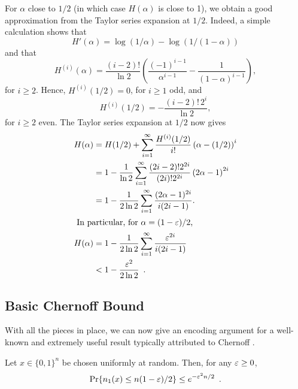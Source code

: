 \documentclass[prodmode,acmcsur]{acmsmall}
\begin{document}
For $\alpha$ close to $1/2$ (in which case $H(\alpha)$ is close to 1),
we obtain a good approximation from the Taylor series expansion at
$1/2$.  Indeed, a simple calculation shows that
\[
  H'(\alpha) = \log (1/\alpha) - \log (1/(1-\alpha))
\]
and that
\[
  H^{(i)}(\alpha) = \frac{(i-2)!}{\ln 2} \left( \frac{(-1)^{i-1}}{\alpha^{i-1}} - \frac{1}{(1-\alpha)^{i-1}}\right) ,
\]
for $i \geq 2$. Hence, $H^{(i)}(1/2) = 0$, for $i \geq 1$ odd, and
\[
  H^{(i)}(1/2) = -\frac{(i-2)!\, 2^i}{\ln 2}, 
\]
for $i \geq 2$ even. The Taylor series expansion at $1/2$ now gives
\begin{align}
  H(\alpha) &= 
  H(1/2) + \sum_{i = 1}^{\infty} \frac{H^{(i)}(1/2)}{i!}
     \left(\alpha-(1/2)\right)^i \notag\\
 &= 
1 - \frac{1}{\ln 2}\sum_{i = 1}^{\infty} \frac{(2i-2)! 2^{2i}}{(2i)!2^{2i}}
     \left(2\alpha-1\right)^{2i}\notag\\
&= 1-\frac{1}{2\ln 2}\sum_{i=1}^{\infty}\frac{(2\alpha-1)^{2i}}{i(2i-1)} .
              \notag \\ 
\intertext{ In particular, for $\alpha=(1-\eps)/2$,}
H(\alpha) & = 1-\frac{1}{2\ln 2}\sum_{i=1}^{\infty}\frac{\eps^{2i}}{i(2i-1)} 
              \notag \\ 
            & < 1-\frac{\eps^2}{2\ln 2} \enspace .\eqlabel{entropy-ii}
\end{align}

\subsection{Basic Chernoff Bound}

With all the pieces in place, we can now give an encoding argument for
a well-known and extremely useful result typically attributed to
Chernoff \cite{chernoff:bound}.

\begin{thm}
  Let $x\in\{0,1\}^n$ be chosen uniformly at random. Then, for any
  $\varepsilon \geq 0$,
  \[
    \Pr\{n_1(x) \le n(1-\varepsilon)/2\} \le e^{-\varepsilon^2n/2} \enspace .
  \]
\end{thm}
\end{document}
